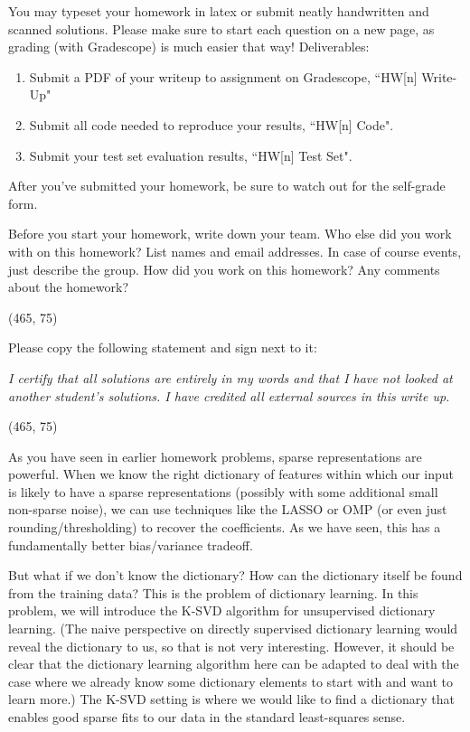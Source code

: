 
You may typeset your homework in latex or submit neatly handwritten and scanned solutions. Please make sure to start each question on a new page, as grading (with Gradescope) is much easier that way! Deliverables:

\begin{enumerate}
  \item Submit a PDF of your writeup to assignment on Gradescope, ``HW[n] Write-Up"
  \item Submit all code needed to reproduce your results, ``HW[n] Code".
  \item Submit your test set evaluation results, ``HW[n] Test Set".
\end{enumerate}

After you've submitted your homework, be sure to watch out for the self-grade form.

\begin{Parts}

\Part Before you start your homework, write down your team. Who else did you work with on this homework? List names and email addresses. In case of course events, just describe the group. How did you work on this homework? Any comments about the homework?

\vspace{15pt}
\framebox(465, 75){}

\Part Please copy the following statement and sign next to it:

\textit{I certify that all solutions are entirely in my words and that I have not looked at another student's solutions. I have credited all external sources in this write up.}

\vspace{15pt}
\framebox(465, 75){}

\end{Parts}

\pagebreak

As you have seen in earlier homework problems, sparse representations
are powerful. When we know the right dictionary of features within
which our input is likely to have a sparse representations (possibly
with some additional small non-sparse noise), we can use techniques
like the LASSO or OMP (or even just rounding/thresholding) to recover
the coefficients. As we have seen, this has a fundamentally better
bias/variance tradeoff. 

But what if we don't know the dictionary? How can the dictionary
itself be found from the training data?  This is the problem of
dictionary learning. In this problem, we will introduce the K-SVD
algorithm for unsupervised dictionary learning. (The naive perspective
on directly supervised dictionary learning would reveal the dictionary
to us, so that is not very interesting. However, it should be clear
that the dictionary learning algorithm here can be adapted to deal
with the case where we already know some dictionary elements to start
with and want to learn more.) The K-SVD setting is where we would like
to find a dictionary that enables good sparse fits to our data in the standard
least-squares sense.  

